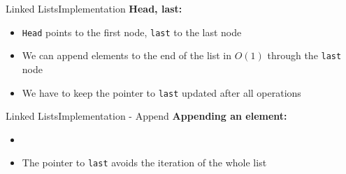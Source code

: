 


\begin{frame}{Linked Lists}{Implementation}
  \textbf{Head, last:}
    \begin{flushleft}
    
  \end{flushleft}
  \begin{itemize}
    \item<3->
      \texttt{Head} points to the first node, \texttt{last} to the last node
    \item<4->
      We can append elements to the end of the list in $O(1)$ through
      the \texttt{last} node
    \item<5->
      We have to keep the pointer to \texttt{last} updated after all operations
  \end{itemize}
\end{frame}


\begin{frame}[fragile]{Linked Lists}{Implementation - Append}
  \textbf{Appending an element:}
  \begin{flushleft}
    
  \end{flushleft}
  \begin{itemize}
  \item<3->
    \vspace{-1.0em}
      
    \item<4->
      \vspace{-1.0em}
      The pointer to \texttt{last} avoids the iteration of the whole list
  \end{itemize}
\end{frame}

